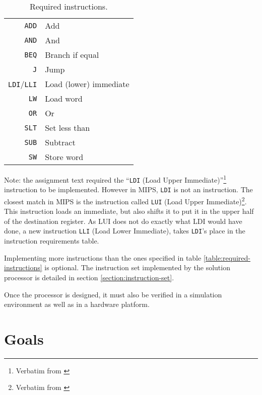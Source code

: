\begin{table}
    \begin{center}
        \begin{tabular}{r|l}
            \texttt{ADD} & Add \\
            \texttt{AND} & And \\
            \texttt{BEQ} & Branch if equal \\
            \texttt{J} & Jump \\
            \texttt{LDI}/\texttt{LLI} & Load (lower) immediate \\
            \texttt{LW} & Load word \\
            \texttt{OR} & Or \\
            \texttt{SLT} & Set less than \\
            \texttt{SUB} & Subtract \\
            \texttt{SW} & Store word \\
            \hline
        \end{tabular}
        \smallskip
        \smallskip
        \caption{Required instructions.}
        \label{table:required-instructions}
    \end{center}
\end{table}

Note: the assignment text required the ``\texttt{LDI} (Load Upper Immediate)''\footnote{Verbatim from \cite[p.114]{compendium}} instruction to be implemented.
However in MIPS, \texttt{LDI} is not an instruction.
The closest match in MIPS is the instruction called \texttt{LUI} (Load Upper Immediate)\footnote{Verbatim from \cite[p.114]{mips-instruction-set}}.
This instruction loads an immediate, but also shifts it to put it in the upper half of the destination register.
As LUI does not do exactly what LDI would have done, a new instruction \texttt{LLI} (Load Lower Immediate), takes \texttt{LDI}'s place in the instruction requirements table.

Implementing more instructions than the ones specified in table \vref{table:required-instructions} is optional.
The instruction set implemented by the solution processor is detailed in section \vref{section:instruction-set}.

Once the processor is designed, it must also be verified in a simulation environment as well as in a hardware platform.

\section{Goals}

